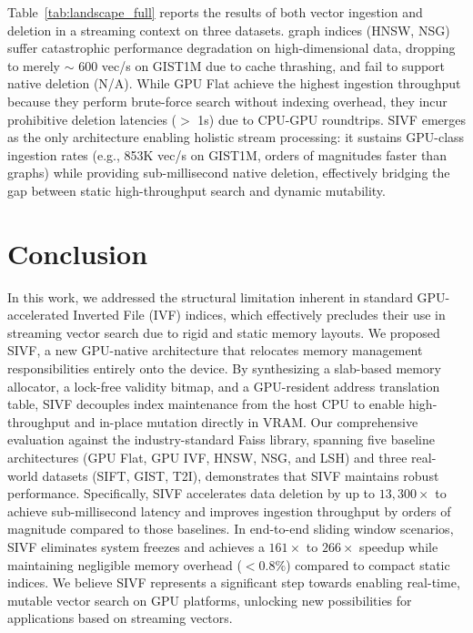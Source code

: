 \documentclass[sigconf,anonymous]{acmart}
\theoremstyle{plain}
\theoremstyle{definition}
\theoremstyle{remark}
\begin{document}
Table~\ref{tab:landscape_full} reports the results of both vector ingestion and deletion in a streaming context on three datasets.
graph indices (HNSW, NSG) suffer catastrophic performance degradation on high-dimensional data, dropping to merely $\sim$ 600 vec/s on GIST1M due to cache thrashing, and fail to support native deletion (N/A). 
While GPU Flat achieve the highest ingestion throughput because they perform brute-force search without indexing overhead, they incur prohibitive deletion latencies ($>$ 1s) due to CPU-GPU roundtrips.
SIVF emerges as the only architecture enabling holistic stream processing: it sustains GPU-class ingestion rates (e.g., 853K vec/s on GIST1M, orders of magnitudes faster than graphs) while providing sub-millisecond native deletion, effectively bridging the gap between static high-throughput search and dynamic mutability.

\section{Conclusion}
\label{sec:conclusion}

In this work, we addressed the structural limitation inherent in standard GPU-accelerated Inverted File (IVF) indices, which effectively precludes their use in streaming vector search due to rigid and static memory layouts. 
We proposed SIVF, a new GPU-native architecture that relocates memory management responsibilities entirely onto the device. 
By synthesizing a slab-based memory allocator, a lock-free validity bitmap, and a GPU-resident address translation table, SIVF decouples index maintenance from the host CPU to enable high-throughput and in-place mutation directly in VRAM.
Our comprehensive evaluation against the industry-standard Faiss library, spanning five baseline architectures (GPU Flat, GPU IVF, HNSW, NSG, and LSH) and three real-world datasets (SIFT, GIST, T2I), demonstrates that SIVF maintains robust performance.
Specifically, SIVF accelerates data deletion by up to $13,300\times$ to achieve sub-millisecond latency and improves ingestion throughput by orders of magnitude compared to those baselines. 
In end-to-end sliding window scenarios, SIVF eliminates system freezes and achieves a $161\times$ to $266\times$ speedup while maintaining negligible memory overhead ($<0.8\%$) compared to compact static indices. 
We believe SIVF represents a significant step towards enabling real-time, mutable vector search on GPU platforms, unlocking new possibilities for applications based on streaming vectors.
\end{document}
